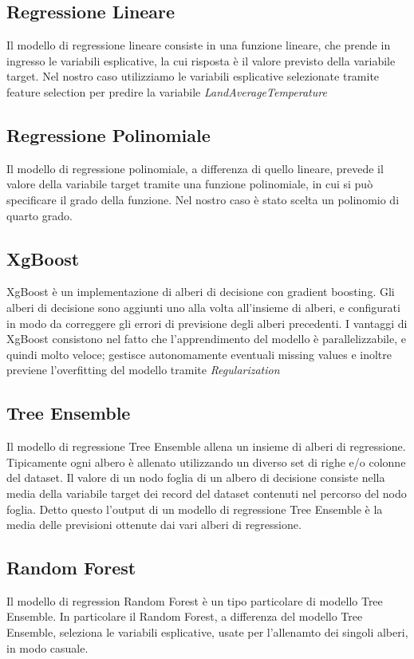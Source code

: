 \documentclass[12pt, a4paper, twocolumn]{article} %
\begin{document}
\subsection{Regressione Lineare}
Il modello di regressione lineare consiste in una funzione lineare, che prende in ingresso le variabili esplicative, la cui risposta è il valore previsto della variabile target. Nel nostro caso utilizziamo le variabili esplicative selezionate tramite feature selection per predire la variabile \textit{LandAverageTemperature}
\subsection{Regressione Polinomiale}
Il modello di regressione polinomiale, a differenza di quello lineare, prevede il valore della variabile target tramite una funzione polinomiale, in cui si può specificare il grado della funzione. Nel nostro caso è stato scelta un polinomio di quarto grado.
\subsection{XgBoost}
XgBoost è un implementazione di alberi di decisione con gradient boosting. Gli alberi di decisione sono aggiunti uno alla volta all'insieme di alberi, e configurati in modo da correggere gli errori di previsione degli alberi precedenti. I vantaggi di XgBoost consistono nel fatto che l'apprendimento del modello è parallelizzabile, e quindi molto veloce; gestisce autonomamente eventuali missing values e inoltre previene l'overfitting del modello tramite \textit{Regularization}
\subsection{Tree Ensemble}
Il modello di regressione Tree Ensemble allena un insieme di alberi di regressione. Tipicamente ogni albero è allenato utilizzando un diverso set di righe e/o colonne del dataset. Il valore di un nodo foglia di un albero di decisione consiste nella media della variabile target dei record del dataset contenuti nel percorso del nodo foglia. Detto questo l'output di un modello di regressione Tree Ensemble è la media delle previsioni ottenute dai vari alberi di regressione.
\subsection{Random Forest}
Il modello di regression Random Forest è un tipo particolare di modello Tree Ensemble. In particolare il Random Forest, a differenza del modello Tree Ensemble, seleziona le variabili esplicative, usate per l'allenamto dei singoli alberi, in modo casuale.
\end{document}
